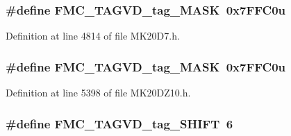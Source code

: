 \subsubsection[{\texorpdfstring{F\+M\+C\+\_\+\+T\+A\+G\+V\+D\+\_\+tag\+\_\+\+M\+A\+SK}{FMC_TAGVD_tag_MASK}}]{\setlength{\rightskip}{0pt plus 5cm}\#define F\+M\+C\+\_\+\+T\+A\+G\+V\+D\+\_\+tag\+\_\+\+M\+A\+SK~0x7\+F\+F\+C0u}\hypertarget{group___f_m_c___register___masks_ga84d9df5059d93e9d8c206114912e728f}{}\label{group___f_m_c___register___masks_ga84d9df5059d93e9d8c206114912e728f}


Definition at line 4814 of file M\+K20\+D7.\+h.

\subsubsection[{\texorpdfstring{F\+M\+C\+\_\+\+T\+A\+G\+V\+D\+\_\+tag\+\_\+\+M\+A\+SK}{FMC_TAGVD_tag_MASK}}]{\setlength{\rightskip}{0pt plus 5cm}\#define F\+M\+C\+\_\+\+T\+A\+G\+V\+D\+\_\+tag\+\_\+\+M\+A\+SK~0x7\+F\+F\+C0u}\hypertarget{group___f_m_c___register___masks_ga84d9df5059d93e9d8c206114912e728f}{}\label{group___f_m_c___register___masks_ga84d9df5059d93e9d8c206114912e728f}


Definition at line 5398 of file M\+K20\+D\+Z10.\+h.

\subsubsection[{\texorpdfstring{F\+M\+C\+\_\+\+T\+A\+G\+V\+D\+\_\+tag\+\_\+\+S\+H\+I\+FT}{FMC_TAGVD_tag_SHIFT}}]{\setlength{\rightskip}{0pt plus 5cm}\#define F\+M\+C\+\_\+\+T\+A\+G\+V\+D\+\_\+tag\+\_\+\+S\+H\+I\+FT~6}\hypertarget{group___f_m_c___register___masks_gae47539ff4ee56bb429932a28a2a4551b}{}\label{group___f_m_c___register___masks_gae47539ff4ee56bb429932a28a2a4551b}


